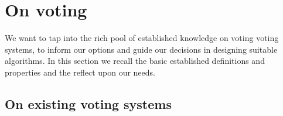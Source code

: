 
\section{On voting}
We want to tap into the rich pool of established knowledge on voting voting systems, to inform our options and guide our decisions in designing suitable algorithms. 
In this section we recall the basic established definitions and properties and the reflect upon our needs.

{\color{blue}{
\begin{verbatim}

3) We're first going to give an overview of 
	* properties of voting systems (viewed on their own)
	* (differentiation between) popular existing voting systems. 
	
\end{verbatim}
}}%

\subsection{On existing voting systems}


